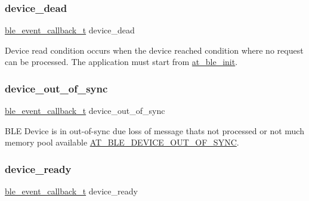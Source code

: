 \mbox{\label{structble__custom__event__cb_abbbc9530a8c2882e78f5948698f4b564}} 
\subsubsection{\texorpdfstring{device\_dead}{device\_dead}}
{\footnotesize\ttfamily \mbox{\hyperlink{ble__manager_8h_a04ce4bb8cb8282f2762e3924b1773cc9}{ble\+\_\+event\+\_\+callback\+\_\+t}} device\+\_\+dead}



Device read condition occurs when the device reached condition where no request can be processed. The application must start from \mbox{\hyperlink{group__gap__dev__config__group_gaa972214071cfa8767b5145eacfa03a90}{at\+\_\+ble\+\_\+init}}. 

\mbox{\label{structble__custom__event__cb_af8a4fcc9e342ecba89cc4f9fdb31d78a}} 
\subsubsection{\texorpdfstring{device\_out\_of\_sync}{device\_out\_of\_sync}}
{\footnotesize\ttfamily \mbox{\hyperlink{ble__manager_8h_a04ce4bb8cb8282f2762e3924b1773cc9}{ble\+\_\+event\+\_\+callback\+\_\+t}} device\+\_\+out\+\_\+of\+\_\+sync}



B\+LE Device is in out-\/of-\/sync due loss of message that\textquotesingle{}s not processed or not much memory pool available \mbox{\hyperlink{at__ble__api_8h_a3324640b95f33169515f89738ed5baebae0cc8d4f98e3215ec1d3b43e8fac6d46}{A\+T\+\_\+\+B\+L\+E\+\_\+\+D\+E\+V\+I\+C\+E\+\_\+\+O\+U\+T\+\_\+\+O\+F\+\_\+\+S\+Y\+NC}}. 

\mbox{\label{structble__custom__event__cb_a31eb831ce5e174b53908aab177569975}} 
\subsubsection{\texorpdfstring{device\_ready}{device\_ready}}
{\footnotesize\ttfamily \mbox{\hyperlink{ble__manager_8h_a04ce4bb8cb8282f2762e3924b1773cc9}{ble\+\_\+event\+\_\+callback\+\_\+t}} device\+\_\+ready}



